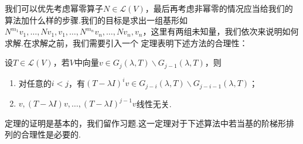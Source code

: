 我们可以优先考虑幂零算子$N\in \mathcal{L}(V)$，最后再考虑非幂零的情况应当给我们的算法加什么样的步骤.我们的目标是求出一组基形如
$N^{m_1}v_1,\ldots,Nv_1,v_1,\ldots,N^{m_n}v_n,\ldots,Nv_n,v_n$，这里有两组未知量，我们依次来说明如何求解.在求解之前，我们需要引入一个
定理表明下述方法的合理性：
\begin{theorem}
    设$T\in \mathcal{L}(V)$，若$V$中向量$v\in G_j(\lambda,T)\backslash G_{j-1}(\lambda,T)$，则
    \begin{enumerate}
        \item 对任意的$i<j$，有$(T-\lambda I)^iv\in G_{j-i}(\lambda,T)\backslash G_{j-i-1}(\lambda,T)$；

        \item $v,(T-\lambda I)v,\ldots,(T-\lambda I)^{j-1}v$线性无关.
    \end{enumerate}
\end{theorem}
定理的证明是基本的，我们留作习题.这一定理对于下述算法中若当基的阶梯形排列的合理性是必要的.
